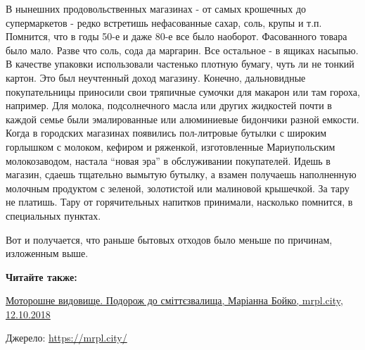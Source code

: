 В нынешних продовольственных магазинах - от самых крошечных до супермаркетов -
редко встретишь нефасованные сахар, соль, крупы и т.п. Помнится, что в годы
50-е и даже 80-е все было наоборот. Фасованного товара было мало. Разве что
соль, сода да маргарин. Все остальное - в ящиках насыпью. В качестве упаковки
использовали частенько плотную бумагу, чуть ли не тонкий картон. Это был
неучтенный доход магазину. Конечно, дальновидные покупательницы приносили свои
тряпичные сумочки для макарон или там гороха, например. Для молока,
подсолнечного масла или других жидкостей почти в каждой семье были
эмалированные или алюминиевые бидончики разной емкости. Когда в городских
магазинах появились пол-литровые бутылки с широким горлышком с молоком, кефиром
и ряженкой, изготовленные Мариупольским молокозаводом, настала \enquote{новая эра} в
обслуживании покупателей. Идешь в магазин, сдаешь тщательно вымытую бутылку, а
взамен получаешь наполненную молочным продуктом с зеленой, золотистой или
малиновой крышечкой. За тару не платишь. Тару от горячительных напитков
принимали, насколько помнится, в специальных пунктах.

Вот и получается, что раньше бытовых отходов было меньше по причинам, изложенным выше.

\textbf{Читайте также:} 

\href{https://mrpl.city/blogs/view/motoroshne-vidovishhe-podorozh-do-smittezvalishha}{%
Моторошне видовище. Подорож до сміттєзвалища, Маріанна Бойко, mrpl.city, 12.10.2018}

Джерело: \url{https://mrpl.city/}
